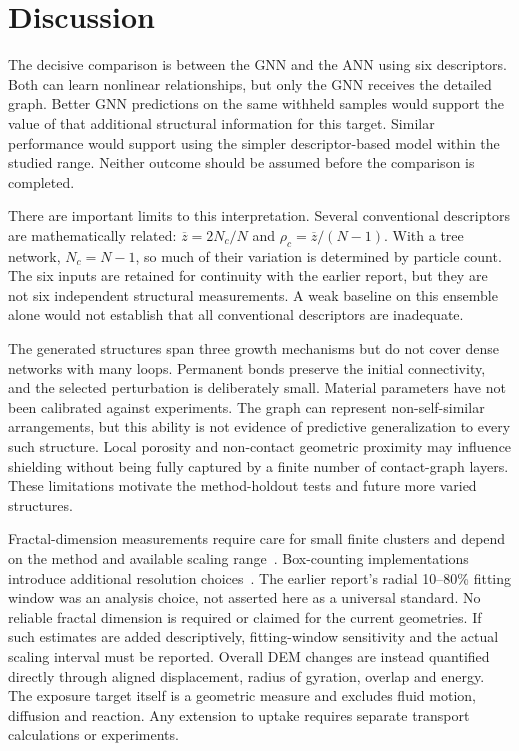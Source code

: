 \documentclass[11pt,a4paper]{article}
\begin{document}
\section{Discussion}
The decisive comparison is between the GNN and the ANN using six descriptors. Both can learn nonlinear relationships, but only the GNN receives the detailed graph. Better GNN predictions on the same withheld samples would support the value of that additional structural information for this target. Similar performance would support using the simpler descriptor-based model within the studied range. Neither outcome should be assumed before the comparison is completed.

There are important limits to this interpretation. Several conventional descriptors are mathematically related: $\overline z=2N_c/N$ and $\rho_c=\overline z/(N-1)$. With a tree network, $N_c=N-1$, so much of their variation is determined by particle count. The six inputs are retained for continuity with the earlier report, but they are not six independent structural measurements. A weak baseline on this ensemble alone would not establish that all conventional descriptors are inadequate.

The generated structures span three growth mechanisms but do not cover dense networks with many loops. Permanent bonds preserve the initial connectivity, and the selected perturbation is deliberately small. Material parameters have not been calibrated against experiments. The graph can represent non-self-similar arrangements, but this ability is not evidence of predictive generalization to every such structure. Local porosity and non-contact geometric proximity may influence shielding without being fully captured by a finite number of contact-graph layers. These limitations motivate the method-holdout tests and future more varied structures.

Fractal-dimension measurements require care for small finite clusters and depend on the method and available scaling range~\cite{Bushell2002,Theiler1990}. Box-counting implementations introduce additional resolution choices~\cite{ForoutanPour1999,Liebovitch1989}. The earlier report's radial 10--80\% fitting window was an analysis choice, not asserted here as a universal standard. No reliable fractal dimension is required or claimed for the current geometries. If such estimates are added descriptively, fitting-window sensitivity and the actual scaling interval must be reported. Overall DEM changes are instead quantified directly through aligned displacement, radius of gyration, overlap and energy. The exposure target itself is a geometric measure and excludes fluid motion, diffusion and reaction. Any extension to uptake requires separate transport calculations or experiments.
\end{document}
